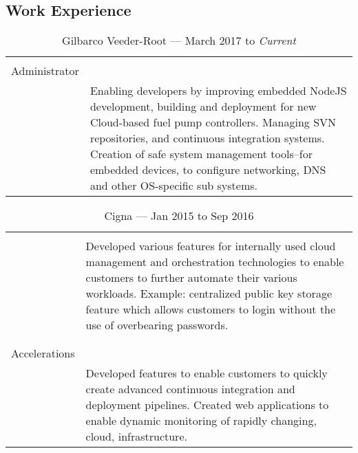 \documentclass[letterpaper,]{article}
\begin{document}
\subsection{Work Experience}\label{work-experience}

\begin{table}[H]
\centering
    \caption{Gilbarco Veeder-Root --- March 2017 to \emph{Current}}
    \begin{tabularx}{\textwidth}{r|X}
        \begin{tabular}{@{}r@{}} %
            System \\
            Administrator\\
        \end{tabular}
        & Enabling developers by improving embedded NodeJS development,
        building and deployment for new Cloud-based fuel pump controllers.
        Managing SVN repositories, and continuous integration systems.
        Creation of safe system management tools--for embedded devices, 
        to configure networking, DNS and other OS-specific sub systems. \\
    \end{tabularx}
\end{table}

\begin{table}[H]
\centering
    \caption{Cigna --- Jan 2015 to Sep 2016}
    \begin{tabularx}{\textwidth}{r|X}
        \begin{tabular}{@{}r@{}}
            Private Cloud \\
        \end{tabular}
        & Developed various features for
        internally used cloud management and orchestration technologies 
        to enable customers to further automate their various workloads. 
        Example: centralized public key storage feature which 
        allows customers to login without the use of overbearing passwords. \\
        & \\
        \begin{tabular}{@{}r@{}}
            Delivery \\
            Accelerations \\
        \end{tabular}
        & Developed features to enable customers to quickly 
        create advanced continuous integration and deployment pipelines. 
        Created web applications to enable dynamic monitoring of rapidly
        changing, cloud, infrastructure.
    \end{tabularx}
\end{table}
\end{document}

